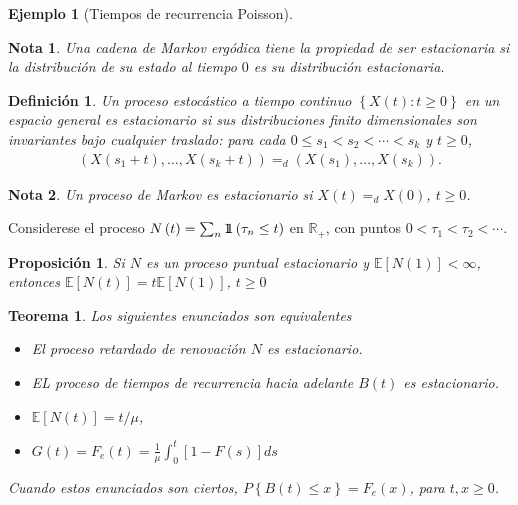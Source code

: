 \documentclass{article}
\newtheorem{Def}{Definición}[section]
\newtheorem{Ejem}{Ejemplo}[section]
\newtheorem{Teo}{Teorema}[section]
\newtheorem{Note}{Nota}[section]
\newtheorem{Prop}{Proposición}[section]
\newcommand{\rea}{\mathbb{R}}
\newcommand{\esp}{\mathbb{E}}
\newcommand{\indora}{\mbox{$1$\hspace{-0.8ex}$1$}}
\numberwithin{equation}{section}
\begin{document}
{\begin{Ejem}[Tiempos de recurrencia Poisson]
\end{Ejem}

\begin{Note}
Una cadena de Markov erg\'odica tiene la propiedad de ser estacionaria si la distribuci\'on de su estado al tiempo $0$ es su distribuci\'on estacionaria.
\end{Note}


\begin{Def}
Un proceso estoc\'astico a tiempo continuo $\left\{X\left(t\right):t\geq0\right\}$ en un espacio general es estacionario si sus distribuciones finito dimensionales son invariantes bajo cualquier  traslado: para cada $0\leq s_{1}<s_{2}<\cdots<s_{k}$ y $t\geq0$,
\begin{eqnarray*}
\left(X\left(s_{1}+t\right),\ldots,X\left(s_{k}+t\right)\right)=_{d}\left(X\left(s_{1}\right),\ldots,X\left(s_{k}\right)\right).
\end{eqnarray*}
\end{Def}

\begin{Note}
Un proceso de Markov es estacionario si $X\left(t\right)=_{d}X\left(0\right)$, $t\geq0$.
\end{Note}

Considerese el proceso $N\left(t\right)=\sum_{n}\indora\left(\tau_{n}\leq t\right)$ en $\rea_{+}$, con puntos $0<\tau_{1}<\tau_{2}<\cdots$.

\begin{Prop}
Si $N$ es un proceso puntual estacionario y $\esp\left[N\left(1\right)\right]<\infty$, entonces $\esp\left[N\left(t\right)\right]=t\esp\left[N\left(1\right)\right]$, $t\geq0$

\end{Prop}

\begin{Teo}
Los siguientes enunciados son equivalentes
\begin{itemize}
\item[i)] El proceso retardado de renovaci\'on $N$ es estacionario.

\item[ii)] EL proceso de tiempos de recurrencia hacia adelante $B\left(t\right)$ es estacionario.


\item[iii)] $\esp\left[N\left(t\right)\right]=t/\mu$,


\item[iv)] $G\left(t\right)=F_{e}\left(t\right)=\frac{1}{\mu}\int_{0}^{t}\left[1-F\left(s\right)\right]ds$
\end{itemize}
Cuando estos enunciados son ciertos, $P\left\{B\left(t\right)\leq x\right\}=F_{e}\left(x\right)$, para $t,x\geq0$.


\end{Teo}}
\end{document}
